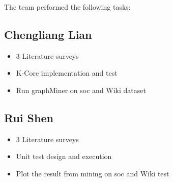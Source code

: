 The team performed the following tasks:
\subsection{Chengliang Lian}
\begin{itemize}
\item 3 Literature surveys
\item K-Core implementation and test
\item Run graphMiner on soc and Wiki dataset
\end{itemize}

\subsection{Rui Shen}
\begin{itemize}
\item 3 Literature surveys
\item Unit test design and execution
\item Plot the result from mining on soc and Wiki test 
\end{itemize}
